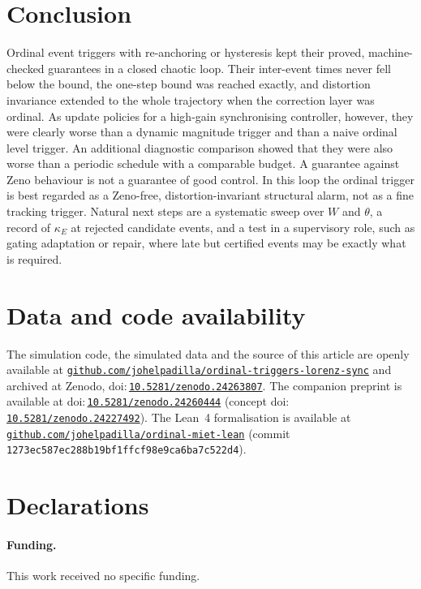 \documentclass[10pt,a4paper]{article}
\providecommand{\doi}[1]{}
\renewcommand{\doi}[1]{doi:\,\href{https://doi.org/#1}{\nolinkurl{#1}}}
\begin{document}
\section{Conclusion}\label{sec:conclusion}

Ordinal event triggers with re-anchoring or hysteresis kept their proved, machine-checked guarantees in a closed chaotic loop. Their inter-event times never fell below the bound, the one-step bound was reached exactly, and distortion invariance extended to the whole trajectory when the correction layer was ordinal. As update policies for a high-gain synchronising controller, however, they were clearly worse than a dynamic magnitude trigger and than a naive ordinal level trigger. An additional diagnostic comparison showed that they were also worse than a periodic schedule with a comparable budget. A guarantee against Zeno behaviour is not a guarantee of good control. In this loop the ordinal trigger is best regarded as a Zeno-free, distortion-invariant structural alarm, not as a fine tracking trigger. Natural next steps are a systematic sweep over $W$ and $\theta$, a record of $\kappa_E$ at rejected candidate events, and a test in a supervisory role, such as gating adaptation or repair, where late but certified events may be exactly what is required.

\section*{Data and code availability}\label{sec:data}
{\sloppy The simulation code, the simulated data and the source of this article are openly available at \href{https://github.com/johelpadilla/ordinal-triggers-lorenz-sync}{\nolinkurl{github.com/johelpadilla/ordinal-triggers-lorenz-sync}} and archived at Zenodo, \doi{10.5281/zenodo.24263807}. The companion preprint is available at \doi{10.5281/zenodo.24260444} (concept \doi{10.5281/zenodo.24227492}). The Lean~4 formalisation is available at \href{https://github.com/johelpadilla/ordinal-miet-lean}{\nolinkurl{github.com/johelpadilla/ordinal-miet-lean}} (commit \texttt{1273ec587ec288b19bf1ffcf98e9ca6ba7c522d4}).\par}

\section*{Declarations}
\paragraph{Funding.} This work received no specific funding.
\end{document}
